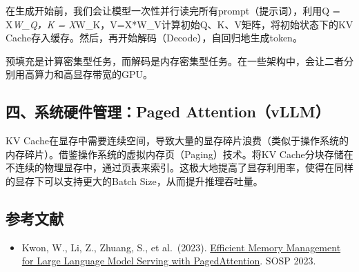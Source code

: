 在生成开始前，我们会让模型一次性并行读完所有prompt（提示词），利用Q = X\emph{W\_Q，K = X}W\_K，V=X*W\_V计算初始Q、K、V矩阵，将初始状态下的KV Cache存入缓存。然后，再开始解码（Decode），自回归地生成token。

预填充是计算密集型任务，而解码是内存密集型任务。在一些架构中，会让二者分别用高算力和高显存带宽的GPU。

\hypertarget{ux56dbux7cfbux7edfux786cux4ef6ux7ba1ux7406paged-attentionvllm}{%
\subsection{四、系统硬件管理：Paged Attention（vLLM）}\label{ux56dbux7cfbux7edfux786cux4ef6ux7ba1ux7406paged-attentionvllm}}

KV Cache在显存中需要连续空间，导致大量的显存碎片浪费（类似于操作系统的内存碎片）。借鉴操作系统的虚拟内存页（Paging）技术。将KV Cache分块存储在不连续的物理显存中，通过页表来索引。这极大地提高了显存利用率，使得在同样的显存下可以支持更大的Batch Size，从而提升推理吞吐量。

\FloatBarrier
{}
\hypertarget{ux53c2ux8003ux6587ux732e-91}{%
\subsection{参考文献}\label{ux53c2ux8003ux6587ux732e-91}}

\vspace{0.25em}
\begin{itemize}
\tightlist
\item
  Kwon, W., Li, Z., Zhuang, S., et al.~(2023). \href{https://arxiv.org/abs/2309.06180}{Efficient Memory Management for Large Language Model Serving with PagedAttention}. SOSP 2023.
\end{itemize}

\clearpage
